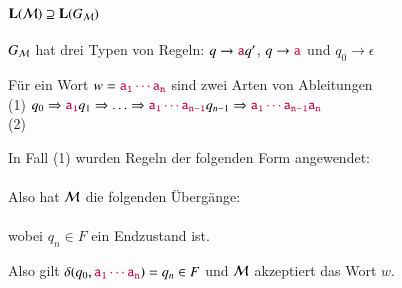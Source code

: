 \documentclass[onlymath]{beamer}
\begin{document}
\begin{frame}[t]\frametitle{$\textbf{\textcolor{black}{L}}(\mathcal{M})\supseteq\textbf{\textcolor{black}{L}}(G_{\mathcal{M}})$}

$G_{\mathcal{M}}$ hat drei Typen von Regeln: $q\to \mathtt{\textcolor{purple}{a}}q'$, $q\to \mathtt{\textcolor{purple}{a}}$ und $q_0\to \epsilon$
\\[1ex]\pause

Für ein Wort $w=\mathtt{\textcolor{purple}{a_1\cdots a_n}}$ sind \alert{zwei} Arten von Ableitungen 
\\[1ex]

(1) $q_0\Rightarrow \mathtt{\textcolor{purple}{a_1}}q_1 \Rightarrow \ldots \Rightarrow\mathtt{\textcolor{purple}{a_1\cdots a_{n-1}}}q_{n-1}\Rightarrow \mathtt{\textcolor{purple}{a_1\cdots a_{n-1}a_n}}$\\[1ex]
(2) 
\bigskip\pause


In Fall (1) wurden Regeln der folgenden Form angewendet:\\[1ex]
\\[1ex]
Also hat $\mathcal{M}$ die folgenden Übergänge: \\[1ex]
\\[1ex]
wobei $q_n\in F$ ein Endzustand ist.
\bigskip\pause

Also gilt $\delta(q_0,\mathtt{\textcolor{purple}{a_1\cdots a_n}})=q_n\in F$ und $\mathcal{M}$ akzeptiert das Wort $w$.

\end{frame}
\end{document}
